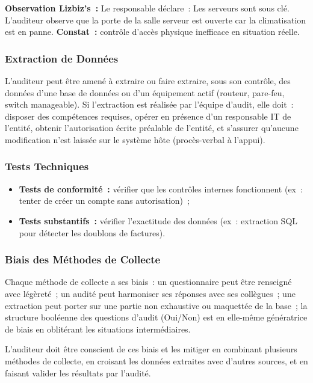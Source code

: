 \begin{boxlizbiz}
\textbf{Observation Lizbiz's~:}
Le responsable déclare~: \og{}Les serveurs sont sous clé\fg{}. L'auditeur observe
que la porte de la salle serveur est ouverte car la climatisation est en panne.
\textbf{Constat~:} contrôle d'accès physique inefficace en situation réelle.
\end{boxlizbiz}

\subsubsection{Extraction de Données}

L'auditeur peut être amené à extraire ou faire extraire, sous son contrôle, des données
d'une base de données ou d'un équipement actif (routeur, pare-feu, switch manageable).
Si l'extraction est réalisée par l'équipe d'audit, elle doit~: disposer des compétences
requises, opérer en présence d'un responsable IT de l'entité, obtenir l'autorisation
écrite préalable de l'entité, et s'assurer qu'aucune modification n'est laissée sur le
système hôte (procès-verbal à l'appui).

\subsubsection{Tests Techniques}
\begin{itemize}
    \item \textbf{Tests de conformité~:} vérifier que les contrôles internes
        fonctionnent (ex~: tenter de créer un compte sans autorisation)~;
    \item \textbf{Tests substantifs~:} vérifier l'exactitude des données (ex~:
        extraction SQL pour détecter les doublons de factures).
\end{itemize}

\subsubsection{Biais des Méthodes de Collecte}
\label{subsubsec:biais-collecte}

Chaque méthode de collecte a ses biais~: un questionnaire peut être renseigné avec
légèreté~; un audité peut harmoniser ses réponses avec ses collègues~; une extraction
peut porter sur une partie non exhaustive ou maquettée de la base~; la structure
booléenne des questions d'audit (Oui/Non) est en elle-même génératrice de biais
en oblitérant les situations intermédiaires.

L'auditeur doit être conscient de ces biais et les mitiger en combinant plusieurs
méthodes de collecte, en croisant les données extraites avec d'autres sources, et en
faisant valider les résultats par l'audité.

